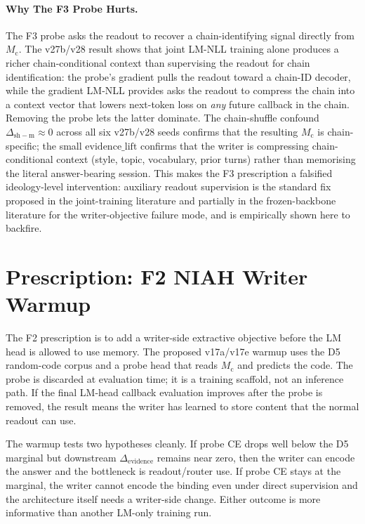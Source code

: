 \documentclass{article}
\newcommand{\Mc}{M_{\mathrm{c}}}
\newcommand{\dsh}{\Delta_{\mathrm{sh-m}}}
\newcommand{\elift}{\Delta_{\mathrm{evidence}}}
\begin{document}
\paragraph{Why The F3 Probe Hurts.}
The F3 probe asks the readout to recover a chain-identifying signal
directly from $\Mc$.  The v27b/v28 result shows that joint LM-NLL
training alone produces a richer chain-conditional context than
supervising the readout for chain identification: the probe's
gradient pulls the readout toward a chain-ID decoder, while the
gradient LM-NLL provides asks the readout to compress the chain into
a context vector that lowers next-token loss on \emph{any} future
callback in the chain.  Removing the probe lets the latter dominate.
The chain-shuffle confound $\dsh \approx 0$ across all six v27b/v28
seeds confirms that the resulting $\Mc$ is chain-specific; the small
$\mathrm{evidence\_lift}$ confirms that the writer is compressing
chain-conditional context (style, topic, vocabulary, prior turns)
rather than memorising the literal answer-bearing session.  This
makes the F3 prescription a falsified ideology-level intervention:
auxiliary readout supervision is the standard fix proposed in the
joint-training literature and partially in the frozen-backbone
literature for the writer-objective failure mode, and is empirically
shown here to backfire.

\section{Prescription: F2 NIAH Writer Warmup}

The F2 prescription is to add a writer-side extractive objective before
the LM head is allowed to use memory.  The proposed v17a/v17e warmup
uses the D5 random-code corpus and a probe head that reads $\Mc$ and
predicts the code.  The probe is discarded at evaluation time; it is a
training scaffold, not an inference path.  If the final LM-head
callback evaluation improves after the probe is removed, the result
means the writer has learned to store content that the normal readout
can use.

The warmup tests two hypotheses cleanly.  If probe CE drops well below
the D5 marginal but downstream $\elift$ remains near zero, then the
writer can encode the answer and the bottleneck is readout/router use.
If probe CE stays at the marginal, the writer cannot encode the binding
even under direct supervision and the architecture itself needs a
writer-side change.  Either outcome is more informative than another
LM-only training run.
\end{document}
